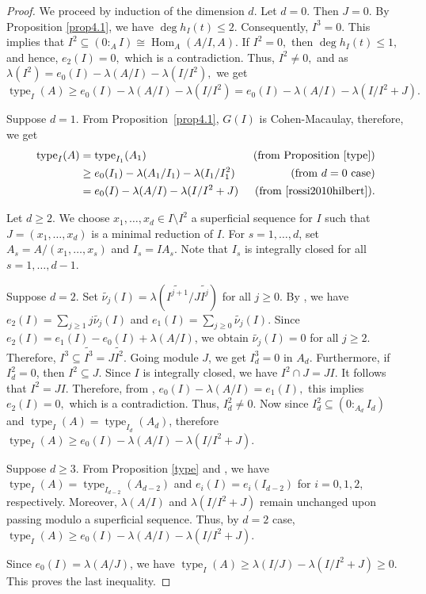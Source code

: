 \documentclass[11pt]{amsart}
\theoremstyle{plain}
\newcommand{\wt}{\widetilde}
\newcommand{\Hom}{\operatorname{Hom}}
\newcommand{\type}{\operatorname{type}}
\theoremstyle{plain}
\begin{document}
\begin{proof}

    We proceed by induction of the dimension $d.$ Let $d=0.$ Then $J=0.$ By  Proposition \ref{prop4.1}, we have $\deg h_{I}(t) \leq 2.$ Consequently, $I^{3}=0.$ This implies that $\displaystyle I^{2} \subseteq (0:_{A}I)\cong \Hom_{A}(A/I,A).$ If $I^{2}=0,$ then  $\deg h_{I}(t) \leq 1,$ and hence, $e_{2}(I)=0,$ which is a contradiction. Thus, $I^{2}\neq 0,$ and as $\lambda(I^2)=e_{0}(I)-\lambda(A/I)-\lambda(I/I^2),$ we get $\type_I(A) \geq e_{0}(I)-\lambda(A/I)-\lambda(I/I^{2})=e_{0}(I)-\lambda(A/I)-\lambda(I/I^{2}+J).$





    Suppose $d=1.$ From Proposition~\ref{prop4.1}, $G(I)$ is Cohen-Macaulay, therefore, we get 
    \begin{align*} 
        \type_I(A)&=\type_{I_1}(A_1) & \text{ (from Proposition \ref{type})}\\
        &\geq e_{0}(I_{1})-\lambda(A_1/I_{1})-\lambda(I_{1}/I_{1}^{2}) & \text{ (from $d=0$ case)}\\
        &=e_{0}(I)-\lambda(A/I)-\lambda(I/I^{2}+J) & \text{  (from \cite[Proposition 1.2]{rossi2010hilbert})}.
    \end{align*}

    Let $d \geq 2.$  We choose $x_{1},\ldots,x_{d} \in I\setminus I^2$  a superficial sequence for $I$ such that $J=(x_{1},\ldots,x_{d})$ is a minimal reduction of $I$. For $s=1,\ldots ,d$,  set $A_s=A/(x_{1},\ldots,x_{s})$ and $I_s=IA_{s}$. Note that  $I_s$ is integrally closed for all $s=1,\ldots , d-1.$

    Suppose $d=2.$  
Set $\wt{\nu_j}(I)=\lambda(\wt{I^{j+1}}/J\wt{I^j})$ for all $j\geq 0.$ By   \cite[Equation 3.1]{rossi2010hilbert}, we have $ \displaystyle e_2(I)=\sum_{j\geq 1}j\wt{\nu_j}(I)$ and $\displaystyle e_1(I)=\sum_{j\geq 0}\wt{\nu_j}(I).$ Since $e_{2}(I)=e_{1}(I)-e_{0}(I)+\lambda(A/I)$, we obtain $\wt{\nu_j}(I)=0$ for all $j\geq 2$. Therefore, $I^3\subseteq\wt{I^3}=J\wt{I^2}.$ Going module $J$, we get $I^3_d=0$ in $A_d.$ Furthermore, if $I^2_d=0$, then $I^2\subseteq J.$ Since $I$ is integrally closed, we have $I^2\cap J=JI$. It follows that $I^2=JI$. Therefore, from \cite[Theorem 16]{HCCMM}, $e_{0}(I)-\lambda(A/I)=e_{1}(I),$ this implies $e_{2}(I)=0,$ which is a contradiction. Thus, $I^2_d\neq0$. Now since $I^2_d \subseteq (0:_{A_{d}}I_{d})$ and $\type_I(A)=\type_{I_d}(A_d)$, therefore
 $\type_I(A) \geq e_{0}(I)-\lambda(A/I)-\lambda(I/I^{2}+J).$

    Suppose $d\geq 3.$ From Proposition \ref{type} and \cite[Proposition 1.2]{rossi2010hilbert}, we have $\type_I(A)=\type_{I_{d-2}}(A_{d-2})$ and $e_i(I)=e_i(I_{d-2})$ for $i=0,1,2$, respectively. Moreover, $\lambda(A/I)$ and $\lambda(I/I^2+J)$ remain unchanged upon passing modulo a superficial sequence. Thus, by $d=2$ case, $\type_I(A) \geq e_{0}(I)-\lambda(A/I)-\lambda(I/I^{2}+J).$

Since $e_0(I)=\lambda(A/J)$, we have $\type_I(A)\geq \lambda(I/J)-\lambda(I/I^{2}+J)\geq 0.$ This proves the last inequality. 
\end{proof}
\end{document}
